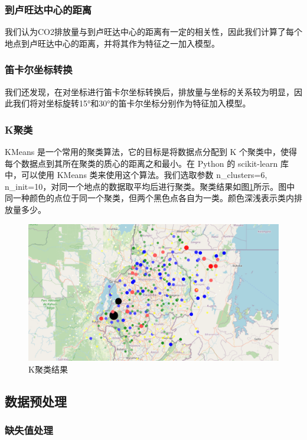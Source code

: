 \documentclass{ctexart}
\begin{document}
\subsubsection{到卢旺达中心的距离}
我们认为CO2排放量与到卢旺达中心的距离有一定的相关性，因此我们计算了每个地点到卢旺达中心的距离，并将其作为特征之一加入模型。

\subsubsection{笛卡尔坐标转换}
我们还发现，在对坐标进行笛卡尔坐标转换后，排放量与坐标的关系较为明显，因此我们将对坐标旋转15°和30°的笛卡尔坐标分别作为特征加入模型。

\subsubsection{K聚类}

KMeans 是一个常用的聚类算法，它的目标是将数据点分配到 K 个聚类中，使得每个数据点到其所在聚类的质心的距离之和最小。在 Python 的 scikit-learn 库中，可以使用 KMeans 类来使用这个算法。我们选取参数 n\_clusters=6, n\_init=10，对同一个地点的数据取平均后进行聚类。聚类结果如图\ref{fig:10}所示。图中同一种颜色的点位于同一个聚类，但两个黑色点各自为一类。颜色深浅表示类内排放量多少。

\begin{figure}[H]
      \centering
      \includegraphics[width=1\textwidth]{output10.png}
      \caption{\label{fig:10}K聚类结果}
\end{figure}

\subsection{数据预处理}

\subsubsection{缺失值处理}
\end{document}
